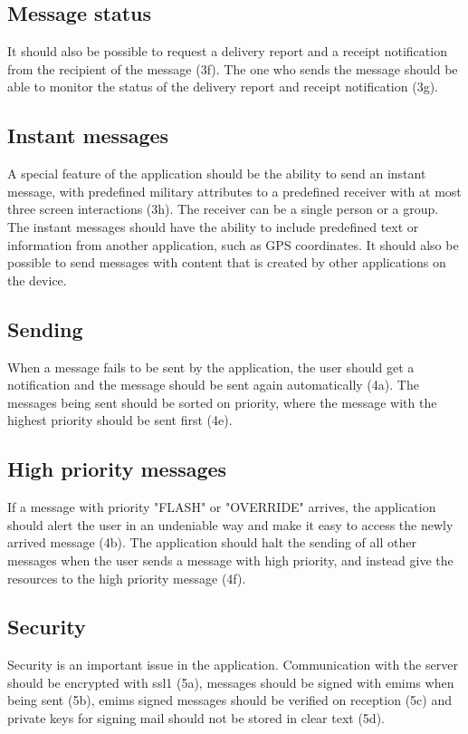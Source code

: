 \subsection{Message status}
It should also be possible to request a delivery report and a receipt notification from the recipient of the message (3f). The one who sends the message should be able to monitor the status of the delivery report and receipt notification (3g).

\subsection{Instant messages}
A special feature of the application should be the ability to send an instant message, with predefined military attributes to a predefined receiver with at most three screen interactions (3h). The receiver can be a single person or a group. The instant messages should have the ability to include predefined text or information from another application, such as GPS coordinates. It should also be possible to send messages with content that is created by other applications on the device.

\subsection{Sending}
When a message fails to be sent by the application, the user should get a notification and the message should be sent again automatically (4a). The messages being sent should be sorted on priority, where the message with the highest priority should be sent first (4e).

\subsection{High priority messages}
If a message with priority "FLASH" or "OVERRIDE" arrives, the application should alert the user in an undeniable way and make it easy to access the newly arrived message (4b). The application should halt the sending of all other messages when the user sends a message with high priority, and instead give the resources to the high priority message (4f).

\subsection{Security}
Security is an important issue in the application. Communication with the server should be encrypted with \gls{ssl1} (5a), messages should be signed with \gls{emims} when being sent (5b), \gls{emims} signed messages should be verified on reception (5c) and private keys for signing mail should not be stored in clear text (5d).